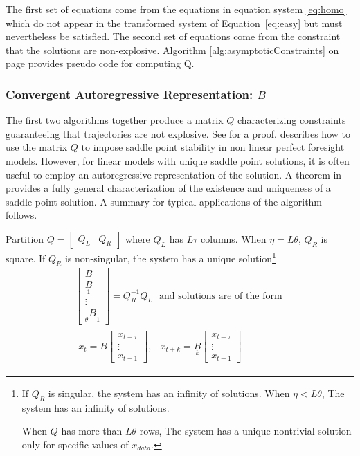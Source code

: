 \documentclass[12pt]{article}
\begin{document}
The first set of equations come from the equations in equation system 
\ref{eq:homo} which do not appear in the transformed system 
of Equation~\ref{eq:easy}
but must nevertheless be satisfied. The second set of equations come from the
constraint that the solutions are non-explosive.
Algorithm \ref{alg:asymptoticConstraints} on page \pageref{alg:asymptoticConstraints} provides pseudo code for computing Q.
  




\subsubsection{Convergent Autoregressive Representation: $B$}
\label{conar}

The first two algorithms  together  produce a matrix $Q$ characterizing
constraints guaranteeing that trajectories are not explosive.  See \cite{anderson10}  for a proof.
\cite{anderson99} describes how to use 
the matrix $Q$  to impose
saddle point stability in non linear perfect foresight models.
However, for linear models with unique  saddle point
solutions, it is often useful to 
employ an autoregressive representation of the solution.
A theorem in \cite{anderson10} 
provides a fully general characterization
of the existence and uniqueness of
a saddle point solution.  
  A summary for typical applications of the algorithm follows.

Partition $Q=
\begin{bmatrix}
  Q_L & Q_R
\end{bmatrix}$ where $Q_L$ has $L\tau$ columns.
When $\eta =L \theta$, $Q_R$ is square.
If  $Q_R$ is non-singular, the system has a unique solution\footnote{
  If $Q_R$ is singular, the system has an infinity of solutions.
  When $\eta <L \theta$,
The system has an infinity of solutions.

  When $Q$ has more than $L \theta$ rows,
The system has a unique nontrivial 
solution only for specific values of $x_{data}$.
}
\begin{gather}
    \begin{bmatrix}
    B \\\underset{1}{B}\\ \vdots \\ \underset{\theta-1}{B}  
  \end{bmatrix}
= Q_R^{-1} Q_L \,\,\text{ and solutions are of the form }\\
\begin{matrix}
x_t=B 
\begin{bmatrix}
  x_{t-\tau}\\
\vdots\\
  x_{t-1}
\end{bmatrix},&
x_{t+k}=\underset{k}{B} 
\begin{bmatrix}
  x_{t-\tau}\\
\vdots\\
  x_{t-1}
\end{bmatrix}
\end{matrix} 
\end{gather}
\end{document}
